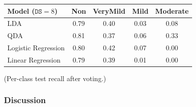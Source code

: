 \documentclass[11pt]{article}
\begin{document}
\begin{center}
\begin{tabular}{lcccc}
\toprule
Model ($\texttt{DS} = 8$) & Non & VeryMild & Mild & Moderate \\
\midrule
LDA                 & 0.79 & 0.40 & 0.03 & 0.08 \\
QDA                 & 0.81 & 0.37 & 0.06 & 0.33 \\
Logistic Regression & 0.80 & 0.42 & 0.07 & 0.00 \\
Linear Regression   & 0.79 & 0.39 & 0.01 & 0.00 \\
\bottomrule
\end{tabular}
\end{center}
\noindent (Per-class test recall after voting.)

\subsubsection*{Discussion}
\end{document}
